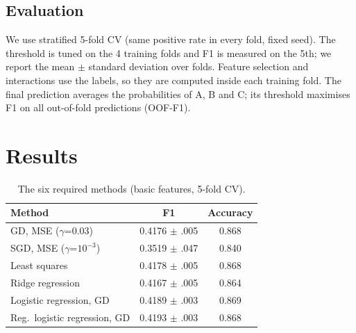 \documentclass[10pt,conference,compsocconf]{IEEEtran}
\begin{document}
\subsection{Evaluation}
We use stratified 5-fold CV (same positive rate in every fold, fixed seed).
The threshold is tuned on the 4 training folds and F1 is measured on the 5th; we report the mean $\pm$ standard deviation over folds.
Feature selection and interactions use the labels, so they are computed inside each training fold.
The final prediction averages the probabilities of A, B and C; its threshold maximises F1 on all out-of-fold predictions (OOF-F1).

\section{Results}

\begin{table}[tbp]
\centering
\caption{The six required methods (basic features, 5-fold CV).}
\label{tab:baselines}
\begin{tabular}{lcc}
\toprule
Method & F1 & Accuracy\\
\midrule
GD, MSE ($\gamma$=0.03) & 0.4176 $\pm$ .005 & 0.868\\
SGD, MSE ($\gamma$=$10^{-3}$) & 0.3519 $\pm$ .047 & 0.840\\
Least squares & 0.4178 $\pm$ .005 & 0.868\\
Ridge regression & 0.4167 $\pm$ .005 & 0.864\\
Logistic regression, GD & 0.4189 $\pm$ .003 & 0.869\\
Reg.\ logistic regression, GD & 0.4193 $\pm$ .003 & 0.868\\
\bottomrule
\end{tabular}
\vspace{-2mm}
\end{table}
\end{document}

